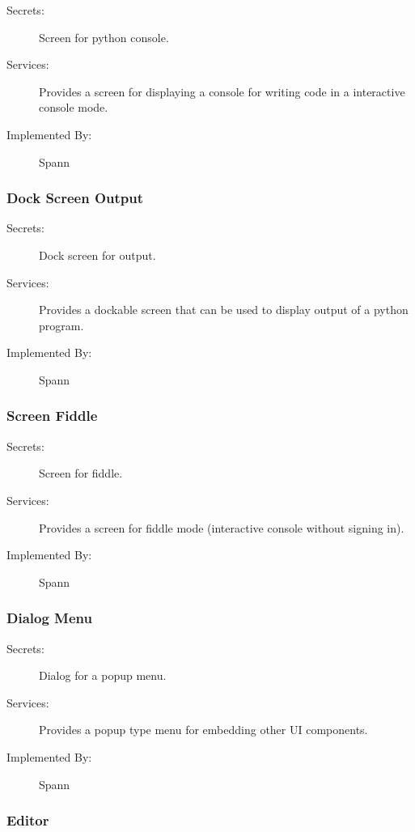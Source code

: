 \documentclass[12pt, titlepage]{article}
\begin{document}
\begin{description}
\item[Secrets:] Screen for python console.
\item[Services:] Provides a screen for displaying a console for writing code
    in a interactive console mode.
\item[Implemented By:] Spann
\end{description}

\subsubsection{Dock Screen Output} \label{mdDockScreenOutput} 

\begin{description}
\item[Secrets:] Dock screen for output.
\item[Services:] Provides a dockable screen that can be used to display output
    of a python program.
\item[Implemented By:] Spann
\end{description}

\subsubsection{Screen Fiddle} \label{mdScreenFiddle}

\begin{description}
\item[Secrets:] Screen for fiddle.
\item[Services:] Provides a screen for fiddle mode (interactive console without
    signing in).
\item[Implemented By:] Spann
\end{description}

\subsubsection{Dialog Menu} \label{mdDialogMenu} 

\begin{description}
\item[Secrets:] Dialog for a popup menu.
\item[Services:] Provides a popup type menu for embedding other UI components.
\item[Implemented By:] Spann
\end{description}

\subsubsection{Editor} \label{mdEditor} 
\end{document}
